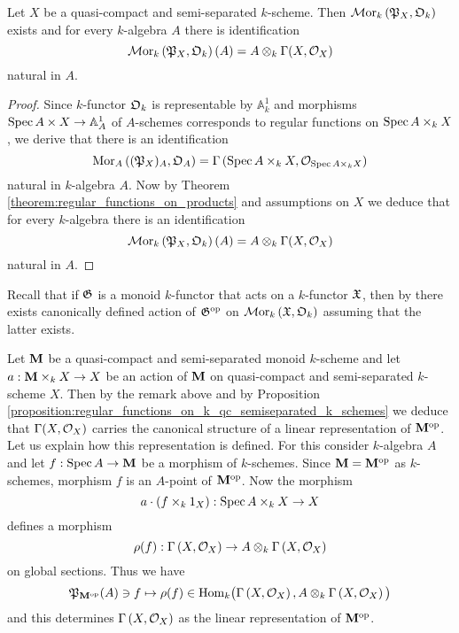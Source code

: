 \begin{proposition}\label{proposition:regular_functions_on_k_qc_semiseparated_k_schemes}
Let $X$ be a quasi-compact and semi-separated $k$-scheme. Then $\mathcal{M}\mathrm{or}_k\left({\mathfrak P}_X,{\mathfrak O}_k\right)$ exists and for every $k$-algebra $A$ there is identification
$$\mathcal{M}\mathrm{or}_k\left({\mathfrak P}_X,{\mathfrak O}_k\right)(A) =  A\otimes_k\Gamma(X,{\mathcal O}_X)$$
natural in $A$.
\end{proposition}
\begin{proof}
Since $k$-functor ${\mathfrak O}_k$ is representable by $\mathbb{A}^1_k$ {\cite[Fact 3.2]{Monoid_k_functors}} and morphisms $\mathrm{Spec}\, A\times X\rightarrow \mathbb{A}^1_A$ of $A$-schemes corresponds to regular functions on $\mathrm{Spec}\, A \times_k X$, we derive that there is an identification
$$\mathrm{Mor}_A\left(({\mathfrak P}_X)_A,{\mathfrak O}_A\right) = \Gamma\left(\mathrm{Spec}\, A\times_k X,{\mathcal O}_{\mathrm{Spec}\, A\times_k X}\right)$$
natural in $k$-algebra $A$. Now by Theorem \ref{theorem:regular_functions_on_products} and assumptions on $X$ we deduce that for every $k$-algebra there is an identification
$$\mathcal{M}\mathrm{or}_k\left({\mathfrak P}_X,{\mathfrak O}_k\right)(A) =  A\otimes_k\Gamma(X,{\mathcal O}_X)$$
natural in $A$.
\end{proof}
\noindent
Recall that if ${\mathfrak G}$ is a monoid $k$-functor that acts on a $k$-functor ${\mathfrak X}$, then by {\cite[Proposition 10.2]{Monoid_k_functors}} there exists canonically defined action of ${\mathfrak G}^{\mathrm{op}}$ on $\mathcal{M}\mathrm{or}_k\left({\mathfrak X},{\mathfrak O}_k\right)$ assuming that the latter exists.

\begin{example}\label{example:k_monoid_action_on_regular_functions}
Let $\mathbf{M}$ be a quasi-compact and semi-separated monoid $k$-scheme and let $a:\mathbf{M}\times_kX\rightarrow X$ be an action of $\mathbf{M}$ on quasi-compact and semi-separated $k$-scheme $X$. Then by the remark above and by Proposition \ref{proposition:regular_functions_on_k_qc_semiseparated_k_schemes} we deduce that $\Gamma(X,{\mathcal O}_X)$ carries the canonical structure of a linear representation of $\mathbf{M}^{\mathrm{op}}$. Let us explain how this representation is defined. For this consider $k$-algebra $A$ and let $f:\mathrm{Spec}\, A\rightarrow \mathbf{M}$ be a morphism of $k$-schemes. Since $\mathbf{M} = \mathbf{M}^{\mathrm{op}}$ as $k$-schemes, morphism $f$ is an $A$-point of $\mathbf{M}^{\mathrm{op}}$. Now the morphism
$$a\cdot \left(f\times_k 1_X\right):\mathrm{Spec}\, A\times_k X\rightarrow X$$
defines a morphism
$$\rho(f):\Gamma\left(X,{\mathcal O}_X\right)\rightarrow A\otimes_k \Gamma\left(X,{\mathcal O}_X\right)$$
on global sections. Thus we have
$${\mathfrak P}_{\mathbf{M}^{\mathrm{op}}}(A)\ni f\mapsto \rho(f) \in \mathrm{Hom}_k\big(\Gamma\left(X,{\mathcal O}_X\right), A\otimes_k \Gamma\left(X,{\mathcal O}_X\right)\big)$$
and this determines $\Gamma\left(X,{\mathcal O}_X\right)$ as the linear representation of $\mathbf{M}^{\mathrm{op}}$.
\end{example}

